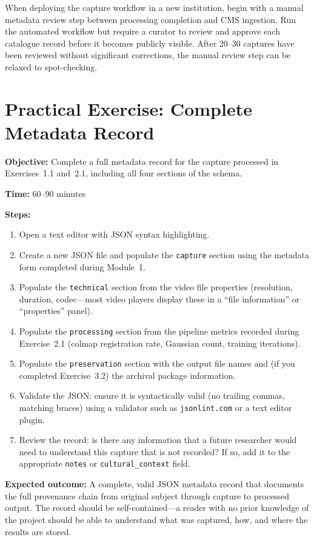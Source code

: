 \begin{recommendation}
When deploying the capture workflow in a new institution, begin with a manual metadata review step between processing completion and CMS ingestion. Run the automated workflow but require a curator to review and approve each catalogue record before it becomes publicly visible. After 20--30 captures have been reviewed without significant corrections, the manual review step can be relaxed to spot-checking.
\end{recommendation}

\section{Practical Exercise: Complete Metadata Record}
\label{sec:meta-exercise}

\begin{tcolorbox}[
  enhanced,
  colback=SuccessGreen!8,
  colframe=SuccessGreen,
  fonttitle=\bfseries\sffamily,
  title={Exercise 5.1: Full Metadata Record},
  sharp corners=south,
  boxrule=0.6pt
]
\textbf{Objective:} Complete a full metadata record for the capture processed in Exercises~1.1 and~2.1, including all four sections of the schema.

\textbf{Time:} 60--90 minutes

\textbf{Steps:}
\begin{enumerate}
  \item Open a text editor with JSON syntax highlighting.
  \item Create a new JSON file and populate the \texttt{capture} section using the metadata form completed during Module~1.
  \item Populate the \texttt{technical} section from the video file properties (resolution, duration, codec---most video players display these in a ``file information'' or ``properties'' panel).
  \item Populate the \texttt{processing} section from the pipeline metrics recorded during Exercise~2.1 (\acrshort{colmap} registration rate, Gaussian count, training iterations).
  \item Populate the \texttt{preservation} section with the output file names and (if you completed Exercise~3.2) the archival package information.
  \item Validate the JSON: ensure it is syntactically valid (no trailing commas, matching braces) using a validator such as \texttt{jsonlint.com} or a text editor plugin.
  \item Review the record: is there any information that a future researcher would need to understand this capture that is not recorded? If so, add it to the appropriate \texttt{notes} or \texttt{cultural\_context} field.
\end{enumerate}

\textbf{Expected outcome:} A complete, valid JSON metadata record that documents the full provenance chain from original subject through capture to processed output. The record should be self-contained---a reader with no prior knowledge of the project should be able to understand what was captured, how, and where the results are stored.
\end{tcolorbox}

